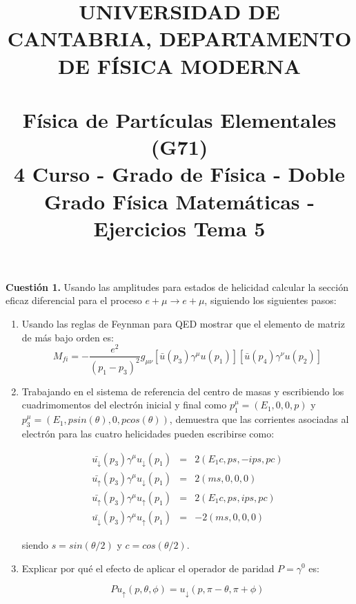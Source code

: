 \documentclass[paper=a4, fontsize=11pt]{scrartcl} %
\date{}
\title{	
\normalfont \normalsize 
\textsc{UNIVERSIDAD DE CANTABRIA, DEPARTAMENTO DE FÍSICA MODERNA} \\ [20pt] %
\horrule{0.5pt} \\[0.4cm] %
\huge Física de Partículas Elementales (G71) \\ %
\normalsize 4 Curso - Grado de Física - Doble Grado Física Matemáticas - Ejercicios Tema 5
\horrule{2pt} \\[0.5cm] %
}
\numberwithin{equation}{section} %
\numberwithin{figure}{section} %
\numberwithin{table}{section} %
\begin{document}
\maketitle %

\vspace{-2.5cm}

\textbf{Cuestión 1.} Usando las amplitudes para estados de helicidad calcular la sección eficaz diferencial para el proceso $e+\mu\rightarrow e+\mu$, siguiendo
los siguientes pasos:

\begin{enumerate}
\item Usando las reglas de Feynman para QED mostrar que el elemento de matriz de más bajo orden es:
\begin{equation*}
M_{fi} = -\frac{e^2}{(p_1-p_3)^2}g_{\mu\nu}[\bar{u}(p_3)\gamma^\mu u(p_1)][\bar{u}(p_4)\gamma^\nu u(p_2)]
\end{equation*}

\item Trabajando en el sistema de referencia del centro de masas y escribiendo los cuadrimomentos del electrón inicial y final como $p_1^\mu = (E_1, 0, 0, p)$ y $p_3^\mu = (E_1, p sin(\theta), 0, p cos(\theta))$, demuestra que las corrientes asociadas al electrón para las cuatro helicidades pueden escribirse como:

\begin{eqnarray*}
\bar{u_{\downarrow}}(p_3)\gamma^\mu u_{\downarrow}(p_1) &=& 2 (E_1 c, ps, -ips, pc) \\
\bar{u_{\uparrow}}(p_3)\gamma^\mu u_{\downarrow}(p_1) &=& 2 (ms, 0, 0, 0) \\
\bar{u_{\uparrow}}(p_3)\gamma^\mu u_{\uparrow}(p_1) &=& 2 (E_1 c, ps, ips, pc) \\
\bar{u_{\downarrow}}(p_3)\gamma^\mu u_{\uparrow}(p_1) &=& -2 (ms, 0, 0, 0)
\end{eqnarray*}

siendo $s = sin(\theta / 2)$ y $c = cos(\theta/2)$.

\item Explicar por qué el efecto de aplicar el operador de paridad $P=\gamma^0$ es:

\begin{equation*}
P{u_{\uparrow}}(p, \theta, \phi) = u_{\downarrow}(p, \pi - \theta, \pi + \phi) 
\end{equation*}


\end{enumerate}
\end{document}
